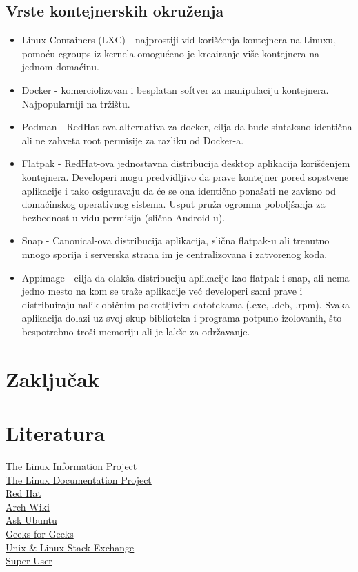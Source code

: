 \documentclass[a4paper,14pt]{article}
\begin{document}
\subsection{Vrste kontejnerskih okruženja}
\begin{itemize}
\item Linux Containers (LXC) - najprostiji vid korišćenja kontejnera na Linuxu, pomoću cgroups iz kernela omogućeno je kreairanje više kontejnera na jednom domaćinu.
\item Docker - komerciolizovan i besplatan softver za manipulaciju kontejnera. Najpopularniji na tržištu.
\item Podman - RedHat-ova alternativa za docker, cilja da bude sintaksno identična ali ne zahveta root permisije za razliku od Docker-a.
\item Flatpak - RedHat-ova jednostavna distribucija desktop aplikacija korišćenjem kontejnera. Developeri mogu predvidljivo da prave kontejner pored sopstvene aplikacije i tako osiguravaju da će se ona identično ponašati ne zavisno od domaćinskog operativnog sistema. Usput pruža ogromna poboljšanja za bezbednost u vidu permisija (slično Android-u).
\item Snap - Canonical-ova distribucija aplikacija, slična flatpak-u ali trenutno mnogo sporija i serverska strana im je centralizovana i zatvorenog koda.
\item Appimage - cilja da olakša distribuciju aplikacije kao flatpak i snap, ali nema jedno mesto na kom se traže aplikacije već developeri sami prave i distribuiraju nalik običnim pokretljivim datotekama (.exe, .deb, .rpm). Svaka aplikacija dolazi uz svoj skup biblioteka i programa potpuno izolovanih, što bespotrebno troši memoriju ali je lakše za održavanje.
\end{itemize}
\newpage

\section{Zaključak}
\newpage

\section{Literatura}
\href{http://www.linfo.org}{The Linux Information Project}
\\
\href{https://tldp.org}{The Linux Documentation Project}
\\
\href{https://www.redhat.com}{Red Hat}
\\
\href{https://wiki.archlinux.org}{Arch Wiki}
\\
\href{https://askubuntu.com}{Ask Ubuntu}
\\
\href{https://www.geeksforgeeks.org}{Geeks for Geeks}
\\
\href{https://unix.stackexchange.com}{Unix \& Linux Stack Exchange}
\\
\href{https://superuser.com}{Super User}
\newpage
\end{document}
